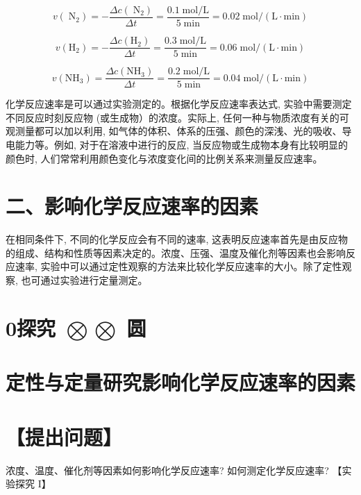 \documentclass[10pt]{article}
\begin{document}
\[
v\left( {\mathrm{\;N}}_{2}\right) = - \frac{{\Delta c}\left( {\mathrm{\;N}}_{2}\right) }{\Delta t} = \frac{{0.1}\mathrm{\;{mol}}/\mathrm{L}}{5\mathrm{\;{min}}} = {0.02}\mathrm{\;{mol}}/\left( {\mathrm{L} \cdot \mathrm{{min}}}\right)
\]

\[
v\left( {\mathrm{H}}_{2}\right) = - \frac{{\Delta c}\left( {\mathrm{H}}_{2}\right) }{\Delta t} = \frac{{0.3}\mathrm{\;{mol}}/\mathrm{L}}{5\mathrm{\;{min}}} = {0.06}\mathrm{\;{mol}}/\left( {\mathrm{L} \cdot \mathrm{{min}}}\right)
\]

\[
v\left( {\mathrm{{NH}}}_{3}\right) = \frac{{\Delta c}\left( {\mathrm{{NH}}}_{3}\right) }{\Delta t} = \frac{{0.2}\mathrm{\;{mol}}/\mathrm{L}}{5\mathrm{\;{min}}} = {0.04}\mathrm{\;{mol}}/\left( {\mathrm{L} \cdot \mathrm{{min}}}\right)
\]

化学反应速率是可以通过实验测定的。根据化学反应速率表达式, 实验中需要测定不同反应时刻反应物 (或生成物）的浓度。实际上, 任何一种与物质浓度有关的可观测量都可以加以利用, 如气体的体积、体系的压强、颜色的深浅、光的吸收、导电能力等。例如, 对于在溶液中进行的反应, 当反应物或生成物本身有比较明显的颜色时, 人们常常利用颜色变化与浓度变化间的比例关系来测量反应速率。

\section*{二、影响化学反应速率的因素}

在相同条件下, 不同的化学反应会有不同的速率, 这表明反应速率首先是由反应物的组成、结构和性质等因素决定的。浓度、压强、温度及催化剂等因素也会影响反应速率, 实验中可以通过定性观察的方法来比较化学反应速率的大小。除了定性观察, 也可通过实验进行定量测定。

\section*{0探究 \(\bigotimes \bigotimes\) 圆}

\section*{定性与定量研究影响化学反应速率的因素}

\section*{【提出问题】}

浓度、温度、催化剂等因素如何影响化学反应速率? 如何测定化学反应速率? 【实验探究 I】
\end{document}
